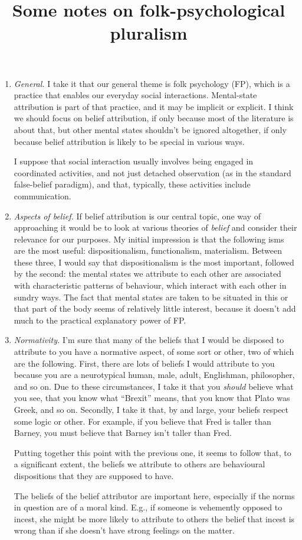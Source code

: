 \documentclass[12pt]{article}
\title{Some notes on folk-psychological pluralism}
\author{}
\date{}
\newcommand{\E}[1]{\emph{#1}}
\newcommand{\Q}[1]{``#1''}
\begin{document}
\maketitle

\begin{enumerate}

\item \E{General.} I take it that our general theme is folk psychology (FP), which is a practice that enables our everyday social interactions. Mental-state attribution is part of that practice, and it may be implicit or explicit. I think we should focus on belief attribution, if only because most of the literature is about that, but other mental states shouldn't be ignored altogether, if only because belief attribution is likely to be special in various ways.
\par I suppose that social interaction usually involves being engaged in coordinated activities, and not just detached observation (as in the standard false-belief paradigm), and that, typically, these activities include communication.

\item \E{Aspects of belief.} If belief attribution is our central topic, one way of approaching it would be to look at various theories of \E{belief} and consider their relevance for our purposes. My initial impression is that the following isms are the most useful: dispositionalism, functionalism, materialism. Between these three, I would say that dispositionalism is the most important, followed by the second: the mental states we attribute to each other are associated with characteristic patterns of behaviour, which interact with each other in sundry ways. The fact that mental states are taken to be situated in this or that part of the body seems of relatively little interest, because it doesn't add much to the practical explanatory power of FP.  

\item \E{Normativity.} I'm sure that many of the beliefs that I would be disposed to attribute to you have a normative aspect, of some sort or other, two of which are the following. First, there are lots of beliefs I would attribute to you because you are a neurotypical human, male, adult, Englishman, philosopher, and so on. Due to these circumstances, I take it that you \E{should} believe what you see, that you know what \Q{Brexit} means, that you know that Plato was Greek, and so on. Secondly, I take it that, by and large, your beliefs respect some logic or other. For example, if you believe that Fred is taller than Barney, you must believe that Barney isn't taller than Fred. 
\par Putting together this point with the previous one, it seems to follow that, to a significant extent, the beliefs we attribute to others are behavioural dispositions that they are supposed to have.
\par The beliefs of the belief attributor are important here, especially if the norms in question are of a moral kind. E.g., if someone is vehemently opposed to incest, she might be more likely to attribute to others the belief that incest is wrong than if she doesn't have strong feelings on the matter.


\end{enumerate}
\end{document}
